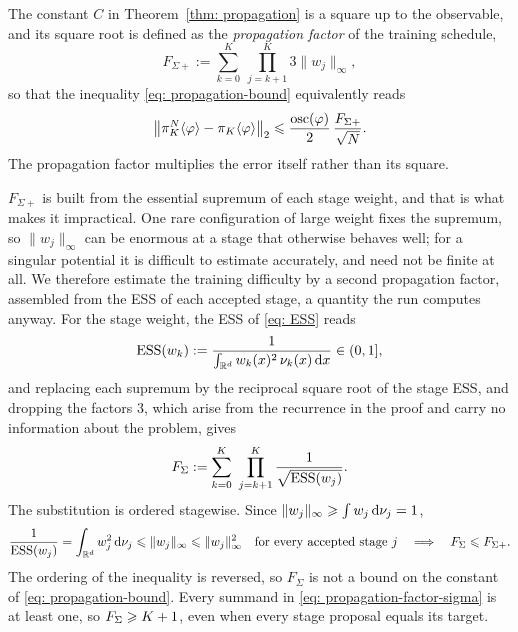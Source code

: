 \documentclass{article}
\begin{document}
{\color{blue}The constant $C$ in Theorem~\ref{thm: propagation} is a square up to the observable, and its square root is defined as the \emph{propagation factor} of the training schedule,}
\begin{equation}
    F_{\Sigma+}
    := \sum_{k=0}^{K}\ \prod_{j=k+1}^{K} 3\lVert w_j \rVert_\infty ,
    \label{eq: propagation-factor-plus}
\end{equation}
{\color{blue}so that the inequality \eqref{eq: propagation-bound} equivalently reads}
\begin{equation*}
    \bigl\lVert \pi_K^N\langle \varphi\rangle - \pi_K\langle \varphi\rangle \bigr\rVert_2
    \leqslant \frac{\operatorname{osc}(\varphi)}{2}\, \frac{F_{\Sigma+}}{\sqrt N}.
\end{equation*}
{\color{blue}The propagation factor multiplies the error itself rather than its square.}

{\color{blue}$F_{\Sigma+}$ is built from the essential supremum of each stage weight, and that is what makes it impractical. One rare configuration of large weight fixes the supremum, so $\lVert w_j \rVert_\infty$ can be enormous at a stage that otherwise behaves well; for a singular potential it is difficult to estimate accurately, and need not be finite at all. We therefore estimate the training difficulty by a second propagation factor, assembled from the ESS of each accepted stage, a quantity the run computes anyway.} For the stage weight, the ESS of \eqref{eq: ESS} reads
\begin{equation}
    \mathrm{ESS}(w_k) := \frac{1}{\int_{\mathbb R^d} w_k(x)^2 \, \nu_k(x) \, \mathrm{d} x} \in (0,1] ,
    \label{eq: propagation-ESS}
\end{equation}
{\color{blue}and replacing each supremum by the reciprocal square root of the stage ESS, and dropping the factors $3$, which arise from the recurrence in the proof and carry no information about the problem, gives}
\begin{equation}
    F_{\Sigma}
    := \sum_{k=0}^{K}\ \prod_{j=k+1}^{K} \frac{1}{\sqrt{\mathrm{ESS}(w_j)}} .
    \label{eq: propagation-factor-sigma}
\end{equation}
The substitution is ordered stagewise. Since $\lVert w_j \rVert_\infty \geqslant \int w_j \, \mathrm{d}\nu_j = 1$,
\begin{equation*}
    \frac{1}{\mathrm{ESS}(w_j)} = \int_{\mathbb R^d} w_j^2 \, \mathrm{d}\nu_j \leqslant \lVert w_j \rVert_\infty \leqslant \lVert w_j \rVert_\infty^{2}
    \quad\text{for every accepted stage } j
    \quad\Longrightarrow\quad
    F_\Sigma \leqslant F_{\Sigma+} .
\end{equation*}
{\color{blue}The ordering of the inequality is reversed, so $F_\Sigma$ is not a bound on the constant of \eqref{eq: propagation-bound}. Every summand in \eqref{eq: propagation-factor-sigma} is at least one, so $F_\Sigma \geqslant K+1$, even when every stage proposal equals its target.}
\end{document}
